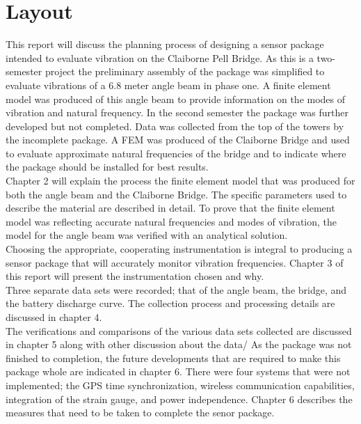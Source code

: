 \section{Layout} 

This report will discuss the planning process of designing a sensor package intended to evaluate vibration on the Claiborne Pell Bridge. As this is a
two-semester project the preliminary assembly of the package was simplified to evaluate vibrations of a 6.8 meter angle beam in phase one. A finite element
model was produced of this angle beam to provide information on the modes of vibration and natural frequency. In the second semester the package was
further developed but not completed. Data was collected from the top of the towers by the incomplete package. A FEM was produced of the Claiborne Bridge
and used to evaluate approximate natural frequencies of the bridge and to indicate where the package should be installed for best results. \\

\indent Chapter 2 will explain the process the finite element model that was produced for both the angle beam and the Claiborne Bridge. The specific
parameters  used to describe the material are described in detail. To prove that the finite element model was reflecting accurate natural frequencies and
modes of vibration, the model for the angle beam was verified with an analytical solution. \\
\indent Choosing the appropriate, cooperating instrumentation is integral to producing a sensor package that will accurately monitor vibration frequencies.
Chapter 3 of this report will present the instrumentation chosen and why. \\
\indent Three separate data sets were recorded; that of the angle beam, the bridge, and the battery discharge curve. The collection process and processing
details are discussed in chapter 4. \\ 
\indent The verifications and comparisons of the various data sets collected are discussed in chapter 5 along with other discussion about the data/ 
\indent As the package was not finished to completion, the future developments that are required to make this package whole are indicated in chapter 6.
There were four systems that were not implemented; the GPS time synchronization, wireless communication capabilities, integration of the strain gauge, and
power independence. Chapter 6 describes the measures that need to be taken to complete the senor package.\\